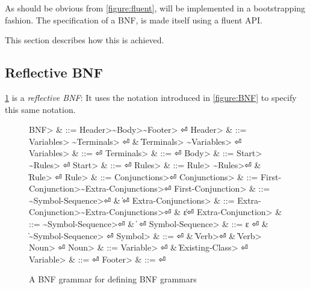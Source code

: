 As should be obvious from \cref{figure:fluent}, \Self will be implemented
  in a bootstrapping fashion.
The specification of a BNF, is made itself using a fluent API.

This section describes how this is achieved.

\subsection{Reflective BNF}
\cref{figure:BNF:BNF} is a \emph{reflective BNF}:
It uses the notation introduced in \cref{figure:BNF}
  to specify this same notation.

\begin{figure}[H]
  \caption{A BNF grammar for defining BNF grammars}
  \label{figure:BNF:BNF}
  \begin{Grammar}
    \begin{aligned}
      \<BNF>                     & ::= \<Header>\~\<Body>\~\<Footer> \hfill⏎
      \<Header>                  & ::= \<Variables> \~\<Terminals> \hfill⏎
      {}                         & \| \<Terminals> \~\<Variables> \hfill⏎
      \<Variables>               & ::= \hfill⏎
      \<Terminals>               & ::= \hfill⏎
      \<Body>                    & ::= \<Start> \~\<Rules> \hfill⏎
      \<Start>                   & ::=  \hfill⏎
      \<Rules>                   & ::= \<Rule> \~\<Rules>\hfill⏎
      {}                         & \| \<Rule> \hfill⏎
      \<Rule>                    & ::=  \<Conjunctions>\hfill⏎
      \<Conjunctions>            & ::= \<First-Conjunction>\~\<Extra-Conjunctions>\hfill⏎
      \<First-Conjunction>       & ::= \~\<Symbol-Sequence>\hfill⏎
      {}                         & \| \hfill⏎
      \<Extra-Conjunctions> & ::= \<Extra-Conjunction>\~\<Extra-Conjunctions>\hfill⏎
      {}                         & \| ε\hfill⏎
      \<Extra-Conjunction>  & ::= \~\<Symbol-Sequence>\hfill⏎
      {}                         & \|  \hfill⏎
      \<Symbol-Sequence>         & ::= ε \hfill⏎
      {}                         & \| \~\<Symbol-Sequence> \hfill⏎
      \<Symbol>                  & ::=  \hfill⏎
      {}                         & \| \<Verb>\hfill⏎
      {}                         & \| \<Verb> \cc{,} \<Noun> \hfill⏎
      \<Noun>                    & ::= \<Variable> \hfill⏎
      {}                         & \| \<Existing-Class> \hfill⏎
      \<Variable>                & ::=  \hfill⏎
      \<Footer>                  & ::= \hfill⏎
    \end{aligned}
  \end{Grammar}
\end{figure}
\begin{comment}
Note that this specification can only be approximate;
the figure uses verbs as replacement to indentation,
and special symbols such as~$|$,~$::-$ and~$ε$.
\end{comment}

